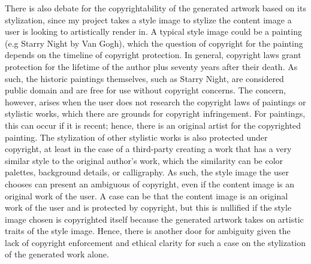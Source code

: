 \documentclass[10pt,twocolumn]{article}
\begin{document}
There is also debate for the copyrightability of the generated artwork based on its stylization, since my project takes a style image to stylize the content image a user is looking to artistically render in. A typical style image could be a painting (e.g Starry Night by Van Gogh), which the question of copyright for the painting depends on the timeline of copyright protection. In general, copyright laws grant protection for the lifetime of the author plus seventy years after their death.\cite{Copyrightgovtime} As such, the historic paintings themselves, such as Starry Night, are considered public domain and are free for use without copyright concerns. The concern, however, arises when the user does not research the copyright laws of paintings or stylistic works, which there are grounds for copyright infringement. For paintings, this can occur if it is recent; hence, there is an original artist for the copyrighted painting. The stylization of other stylistic works is also protected under copyright, at least in the case of a third-party creating a work that has a very similar style to the original author’s work, which the similarity can be color palettes, background details, or calligraphy.  As such, the style image the user chooses can present an ambiguous of copyright, even if the content image is an original work of the user. A case can be that the content image is an original work of the user and is protected by copyright, but this is nullified if the style image chosen is copyrighted itself because the generated artwork takes on artistic traits of the style image. Hence, there is another door for ambiguity given the lack of copyright enforcement and ethical clarity for such a case on the stylization of the generated work alone.
\end{document}
